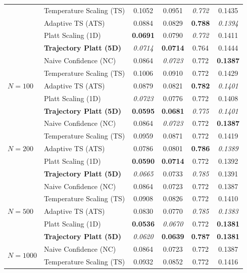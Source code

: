 \begin{table}[t]
\begin{tabular}{llcccc}
 & Temperature Scaling (TS) & 0.1052 & 0.0951 & \textit{0.772} & 0.1435 \\
 & Adaptive TS (ATS) & 0.0884 & 0.0829 & \textbf{0.788} & \textit{0.1394} \\
 & Platt Scaling (1D) & \textbf{0.0691} & 0.0790 & \textit{0.772} & 0.1411 \\
 & \textbf{Trajectory Platt (5D)} & \textit{0.0714} & \textbf{0.0714} & 0.764 & 0.1444 \\
\midrule
\multirow{5}{*}{$N = 100$} & Naive Confidence (NC) & 0.0864 & \textit{0.0723} & 0.772 & \textbf{0.1387} \\
 & Temperature Scaling (TS) & 0.1006 & 0.0910 & 0.772 & 0.1429 \\
 & Adaptive TS (ATS) & 0.0879 & 0.0821 & \textbf{0.782} & \textit{0.1401} \\
 & Platt Scaling (1D) & \textit{0.0723} & 0.0776 & 0.772 & 0.1408 \\
 & \textbf{Trajectory Platt (5D)} & \textbf{0.0595} & \textbf{0.0681} & \textit{0.775} & \textit{0.1401} \\
\midrule
\multirow{5}{*}{$N = 200$} & Naive Confidence (NC) & 0.0864 & \textit{0.0723} & 0.772 & \textbf{0.1387} \\
 & Temperature Scaling (TS) & 0.0959 & 0.0871 & 0.772 & 0.1419 \\
 & Adaptive TS (ATS) & 0.0786 & 0.0801 & \textbf{0.786} & \textit{0.1389} \\
 & Platt Scaling (1D) & \textbf{0.0590} & \textbf{0.0714} & 0.772 & 0.1392 \\
 & \textbf{Trajectory Platt (5D)} & \textit{0.0665} & 0.0733 & \textit{0.785} & 0.1391 \\
\midrule
\multirow{5}{*}{$N = 500$} & Naive Confidence (NC) & 0.0864 & 0.0723 & 0.772 & 0.1387 \\
 & Temperature Scaling (TS) & 0.0908 & 0.0826 & 0.772 & 0.1410 \\
 & Adaptive TS (ATS) & 0.0830 & 0.0770 & \textit{0.785} & \textit{0.1383} \\
 & Platt Scaling (1D) & \textbf{0.0536} & \textit{0.0670} & 0.772 & \textbf{0.1381} \\
 & \textbf{Trajectory Platt (5D)} & \textit{0.0620} & \textbf{0.0639} & \textbf{0.787} & \textbf{0.1381} \\
\midrule
\multirow{5}{*}{$N = 1000$} & Naive Confidence (NC) & 0.0864 & 0.0723 & 0.772 & 0.1387 \\
 & Temperature Scaling (TS) & 0.0932 & 0.0852 & 0.772 & 0.1416 \\

\end{tabular}
\end{table}
